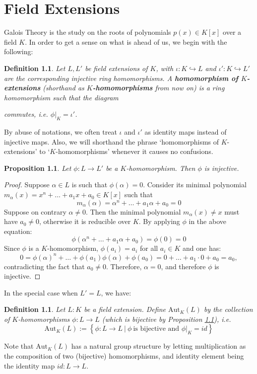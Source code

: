 \documentclass[11pt]{book}
\newtheorem{definition}[theorem]{Definition}
\newtheorem{proposition}[theorem]{Proposition}
\begin{document}
\chapter{Field Extensions}
Galois Theory is the study on the roots of polynomials \(p(x) \in K[x]\) over a field $K$. In order to get a sense on what is ahead of us, we begin with the following:
\begin{definition}
    Let \(L, L'\) be field extensions of \(K\), with $\iota: K \hookrightarrow L$ and $\iota': K \hookrightarrow L'$
    are the corresponding injective ring homomorphisms.
    A {\bf homomorphism of \(K\)-extensions} (shorthand as {\bf $K$-homomorphisms} from now on) is a ring homomorphism such that the diagram
\begin{center}
\end{center}
commutes, i.e. $\phi|_K = \iota'$.
\end{definition}
By abuse of notations, we often treat $\iota$ and $\iota'$ as identity maps instead of injective maps. Also, we will shorthand the phrase `homomorphisms of $K$-extensions' to `$K$-homomorphisms' whenever it causes no confusions.
\begin{proposition} \label{prop-khominjevtive}
    Let $\phi: L \to L'$ be a $K$-homomorphism. Then $\phi$ is injective.
\end{proposition}
\begin{proof}
    Suppose $\alpha \in L$ is such that $\phi(\alpha) = 0$. Consider its minimal polynomial $m_{\alpha}(x) = x^n + \dots + a_1x + a_0 \in K[x]$ such that
    $$m_{\alpha}(\alpha) = \alpha^n + \dots + a_1 \alpha + a_0 = 0$$
    Suppose on contrary $\alpha \neq 0$. Then the minimal polynomial $m_{\alpha}(x) \neq x$ must have $a_0 \neq 0$, otherwise it is reducible over $K$. By applying $\phi$ in the above equation:
    $$\phi(\alpha^n + \dots + a_1 \alpha + a_0) = \phi(0) = 0$$
    Since $\phi$ is a $K$-homomorphism,  $\phi(a_i) = a_i$ for all $a_i \in K$ and one has:
    $$0 = \phi(\alpha)^n + \dots + \phi(a_1) \phi(\alpha) + \phi(a_0) = 0 + \dots + a_1 \cdot 0 + a_0 = a_0,$$
    contradicting the fact that $a_0 \neq 0$. Therefore, $\alpha = 0$, and therefore $\phi$ is injective.
\end{proof}
In the special case when \(L' = L\), we have:
\begin{definition}
Let $L:K$ be a field extension. Define $\mathrm{Aut}_K(L)$ by the collection of $K$-homomorphisms $\phi: L \to L$ (which is bijective by Proposition \ref{prop-khominjevtive}), i.e.
\[
     \mathrm{Aut}_K(L) := \left\{\phi: L \to L \ |\ \phi\ \text{is bijective and } \phi|_K = id \right\} 
\]    
\end{definition}
Note that $\mathrm{Aut}_K(L)$ has a natural group structure by letting multiplication as the 
composition of two (bijective) homomorphisms, and identity element being the identity map $id: L \to L$. 
\end{document}
